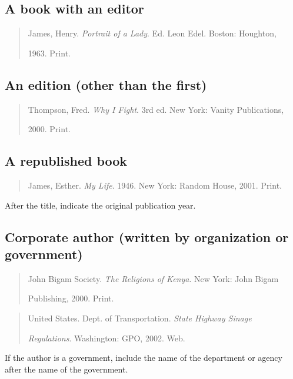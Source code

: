 \subsection{A book with an editor}
\begin{quote}
James, Henry. \emph{Portrait of a Lady}. Ed. Leon Edel. Boston: Houghton,

\hspace{.4in}1963. Print.
\end{quote}

\subsection{An edition (other than the first)}
\begin{quote}
Thompson, Fred. \emph{Why I Fight}. 3rd ed. New York: Vanity Publications,

\hspace{.4in}2000. Print.
\end{quote}

\subsection{A republished book}
\begin{quote}
James, Esther. \emph{My Life}. 1946. New York: Random House, 2001. Print.
\end{quote}
 After the title, indicate the original publication year.

\subsection{Corporate author (written by organization or government)}
\begin{quote}
John Bigam Society. \emph{The Religions of Kenya}. New York: John Bigam 

\hspace{.4in}Publishing, 2000. Print.
\end{quote}

\begin{quote}

United States. Dept. of Transportation. \emph{State Highway Sinage}

\hspace{.4in} \emph{Regulations}. Washington: GPO, 2002. Web.

\end{quote}
 If the author is a government, include the name of the department or agency after the name of the government.

